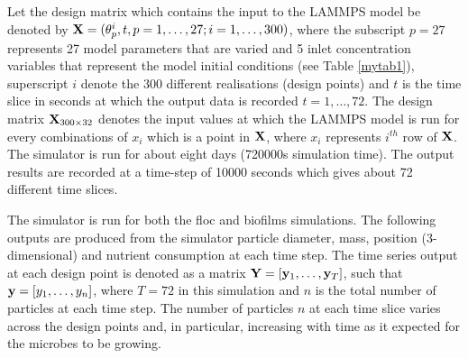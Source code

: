 Let the design matrix which contains the input to the LAMMPS model be denoted by ${\bf X}=(\theta^i_p, t, p=1,\ldots,27; i=1,\ldots,300)$, where the subscript $p=27$ represents 27 model parameters that are varied and 5 inlet concentration variables that represent the model initial conditions (see Table \ref{mytab1}), superscript $i$ denote the 300 different realisations (design points) and $t$ is the time slice in seconds at which the output data is recorded $t=1,\ldots,72$. The design matrix ${\bf X}_{300 \times 32}$ denotes the input values at which the LAMMPS model is run for every combinations of $x_i$ which is a point in ${\bf X}$, where $x_i$ represents $i^{th}$ row of ${\bf X}$.  The simulator is run for about eight days (720000s simulation time). The output results are recorded at a time-step of 10000 seconds which gives about 72 different time slices.

 The simulator is run for both the floc and biofilms simulations. The following outputs are produced from the simulator particle diameter, mass, position (3-dimensional) and nutrient consumption at each time step. The time series output at each design point is denoted as a matrix ${\bf Y}=[{\bf y}_1,\ldots,{\bf y}_T]$, such that ${\bf y}=[y_1,\ldots,y_n]$,  where $T=72$ in this simulation and $n$ is the total number of particles at each time step. The number of particles $n$ at each time slice varies across the design points and, in particular, increasing with time as it expected for the microbes to be growing. %

